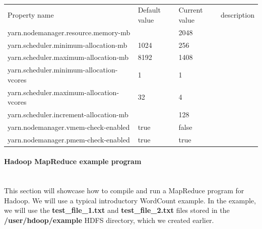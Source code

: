 \documentclass[12pt,english]{book}
\begin{document}
\begin{table}[H]
\begin{tabular}{llll}
\rowcolor[HTML]{4472C4} 
{\color[HTML]{FFFFFF} Property name}  & {\color[HTML]{FFFFFF} Default value} & {\color[HTML]{FFFFFF} Current value} & {\color[HTML]{FFFFFF} description} \\
\rowcolor[HTML]{D9E2F3} 
yarn.nodemanager.resource.memory-mb      &                                          & 2048                                   &                                    \\
yarn.scheduler.minimum-allocation-mb     & 1024                                     & 256                                    &                                    \\
\rowcolor[HTML]{D9E2F3} 
yarn.scheduler.maximum-allocation-mb     & 8192                                     & 1408                                   &                                    \\
yarn.scheduler.minimum-allocation-vcores & 1                                        & 1                                      &                                    \\
\rowcolor[HTML]{D9E2F3} 
yarn.scheduler.maximum-allocation-vcores & 32                                       & 4                                      &                                    \\
yarn.scheduler.increment-allocation-mb   &                                          & 128                                    &                                    \\
\rowcolor[HTML]{D9E2F3} 
yarn.nodemanager.vmem-check-enabled      & true                                     & false                                  &                                    \\
yarn.nodemanager.pmem-check-enabled      & true                                     & true                                   &                                   
\end{tabular}
\caption{}
\end{table}

\paragraph{Hadoop MapReduce example program}\mbox{}\\

This section will showcase how to compile and run a MapReduce program for Hadoop.
We will use a typical introductory WordCount example.
In the example, we will use the \textbf{test\_file\_1.txt} and \textbf{test\_file\_2.txt} files stored in the \textbf{/user/hdoop/example} HDFS directory, which we created earlier.
\end{document}
